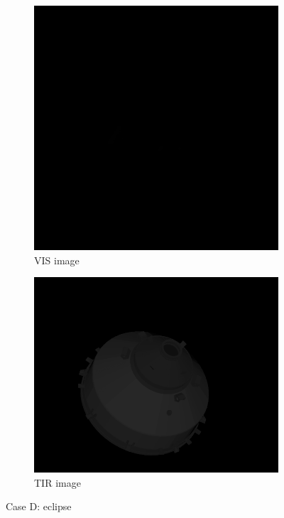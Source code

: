 \begin{figure}[H]
\centering
\begin{subfigure}{0.2576\linewidth}
    \centering
    \includegraphics[width = \linewidth]{Images/Cas4Vis.png}
    \caption{VIS image}
    \label{fig:Cas4Vis}
\end{subfigure}\quad\quad\quad\quad\quad\quad\quad
\begin{subfigure}{0.32\linewidth}
    \centering
    \includegraphics[width = \linewidth]{Images/eclipseTir.png}
    \caption{TIR image}
    \label{fig:Cas4Tir}
\end{subfigure}
\caption{Case D: eclipse}
\label{fig:Cas4}
\end{figure}
